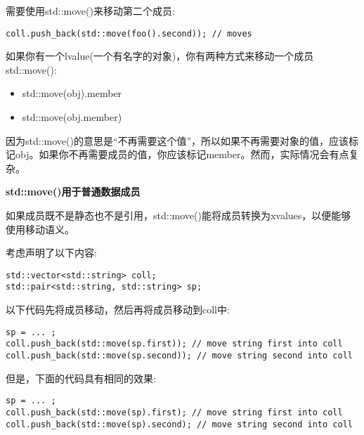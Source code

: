 需要使用std::move()来移动第二个成员:\par

\begin{lstlisting}[caption={}]
coll.push_back(std::move(foo().second)); // moves
\end{lstlisting}

如果你有一个lvalue(一个有名字的对象)，你有两种方式来移动一个成员std::move():\par

\begin{itemize}
	\item std::move(obj).member
	\item std::move(obj.member)
\end{itemize}

因为std::move()的意思是“不再需要这个值”，所以如果不再需要对象的值，应该标记obj。如果你不再需要成员的值，你应该标记member。然而，实际情况会有点复杂。\par

\hspace*{\fill} \par %
\textbf{std::move()用于普通数据成员}

如果成员既不是静态也不是引用，std::move()能将成员转换为xvalues，以便能够使用移动语义。\par

考虑声明了以下内容:\par

\begin{lstlisting}[caption={}]
std::vector<std::string> coll;
std::pair<std::string, std::string> sp;
\end{lstlisting}

以下代码先将成员移动，然后再将成员移动到coll中:\par

\begin{lstlisting}[caption={}]
sp = ... ;
coll.push_back(std::move(sp.first)); // move string first into coll
coll.push_back(std::move(sp.second)); // move string second into coll
\end{lstlisting}

但是，下面的代码具有相同的效果:\par

\begin{lstlisting}[caption={}]
sp = ... ;
coll.push_back(std::move(sp).first); // move string first into coll
coll.push_back(std::move(sp).second); // move string second into coll
\end{lstlisting}

